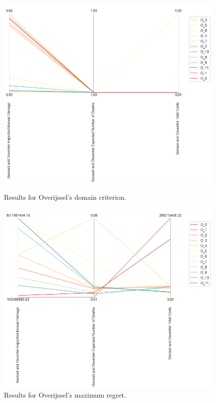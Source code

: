 \begin{figure}[H]
  \centering
  \begin{minipage}[b]{0.4\textwidth}
    \includegraphics[width=1.2\textwidth]{report/figures/results/domain_criterion_Overijssel.png}
    \caption{Results for Overijssel's domain criterion.}
    \label{fig:domain_criterion_Overijssels}
  \end{minipage}
  \hfill
  \begin{minipage}[b]{0.4\textwidth}
    \includegraphics[width=1.2\textwidth]{report/figures/results/regret_figure_Overijssel.png}
    \caption{Results for Overijssel's maximum regret.}
    \label{fig:regret_Overijssels}
  \end{minipage}
\end{figure}


